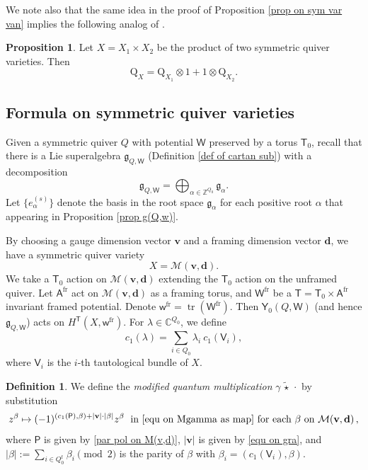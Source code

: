 \documentclass[10pt]{amsart}
\theoremstyle{definition}
\newtheorem{Proposition}[Theorem]{Proposition}
\newtheorem{Definition}[Theorem]{Definition}
\numberwithin{equation}{section}
\newcommand{\sQ}{\mathrm{Q}}
\newcommand{\bC}{\mathbb{C}}
\newcommand{\bZ}{\mathbb{Z}}
\newcommand{\bv}{\mathbf{v}}
\newcommand{\bd}{\mathbf{d}}
\newcommand{\cM}{\mathcal{M}}
\newcommand{\sA}{\mathsf{A}}
\newcommand{\sT}{\mathsf{T}}
\newcommand{\sW}{\mathsf{W}}
\newcommand{\sw}{\mathsf{w}}
\newcommand{\tr}{\operatorname{tr}}
\begin{document}
We note also that the same idea in the proof of Proposition \ref{prop on sym var van} implies the following analog of \cite[Prop.~7.5.1]{MO}.
\begin{Proposition}\label{prop on tens of Q}
Let $X=X_1\times X_2$ be the product of two symmetric quiver varieties. Then 
$$\sQ_{X}=\sQ_{X_1}\otimes 1+1\otimes \sQ_{X_2}. $$
\end{Proposition}


\subsection{Formula on symmetric quiver varieties}

Given a symmetric quiver $Q$ with potential $\sW$ preserved by a torus $\sT_0$, recall that there is a Lie superalgebra $\mathfrak{g}_{Q,\sW}$ 
(Definition \ref{def of cartan sub}) with a decomposition 
$$\mathfrak{g}_{Q,\sW}=\bigoplus_{\alpha\in \bZ^{Q_0}} \mathfrak{g}_{\alpha}. $$
Let $\{e_{\alpha}^{(s)}\}$ denote the basis in the root space $\mathfrak{g}_{\alpha}$ for each positive root $\alpha$ that appearing in Proposition \ref{prop g(Q,w)}.

By choosing a gauge dimension vector $\bv$ and a framing dimension vector $\bd$, we have a symmetric quiver variety 
$$X=\cM(\bv,\bd). $$ 
We take a $\sT_0$ action on $\cM(\bv,\bd)$ extending the $\sT_0$ action on the unframed quiver.
Let $\sA^{\mathrm{fr}}$ act on $\cM(\bv,\bd)$ as a framing torus, and $\sW^{\mathrm{fr}}$ be a $\sT=\sT_0\times \sA^{\mathrm{fr}}$ invariant framed potential. Denote $\sw^{\mathrm{fr}}=\tr(\sW^{\mathrm{fr}})$. 
Then $\mathsf Y_0(Q,\sW)$ (and hence $\mathfrak{g}_{Q,\sW}$) acts on $H^\sT(X,\sw^{\mathrm{fr}})$.
For $\lambda\in \bC^{Q_0}$, we define 
$$c_1(\lambda)=\sum_{i\in Q_0}\lambda_{i} \:c_1(\mathsf V_i), $$ 
where $\mathsf V_i$ is the $i$-th tautological bundle of $X$. 
\begin{Definition}\label{def modified quant mult}
We define the \textit{modified quantum multiplication} 
$\gamma\, \widetilde{\star}\,\cdot$ by substitution
\begin{align*}
    z^\beta\mapsto (-1)^{(c_1(\mathsf P),\beta)+|\bv|\cdot |\beta|} z^\beta \;\text{ in } \eqref{equ on Mgamma as map} \text{ for }\text{each}\,\,\beta\,\, \text{on}\,\,\cM(\bv,\bd)\,,
\end{align*}
where $\mathsf P$ is given by \eqref{par pol on M(v,d)}, $|\bv|$ is given by \eqref{equ on gra}, and $|\beta|:=\sum_{i\in Q_0^{\mathrm{f}}}\beta_i\pmod 2$
is the parity of $\beta$ with $\beta_i=(c_1(\mathsf V_i),\beta)$. 
\end{Definition}
\end{document}
